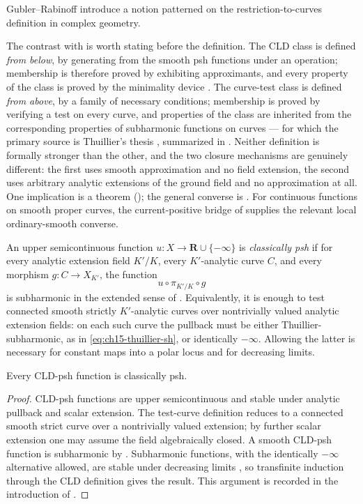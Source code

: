 Gubler--Rabinoff introduce a notion patterned on the restriction-to-curves
definition in complex geometry.

The contrast with  is worth stating before the definition.
The CLD class is defined \emph{from below}, by generating from the smooth
psh functions under an operation; membership is therefore proved by
exhibiting approximants, and every property of the class is proved by the
minimality device .  The curve-test class is
defined \emph{from above}, by a family of necessary conditions; membership is
proved by verifying a test on every curve, and properties of the class are
inherited from the corresponding properties of subharmonic functions on
curves --- for which the primary source is Thuillier's thesis \cite{Thu05},
summarized in .  Neither definition is
formally stronger than the other, and the two closure
mechanisms are genuinely different: the first uses smooth approximation and
no field extension, the second uses arbitrary analytic extensions of the
ground field and no approximation at all.  One implication is a theorem
(); the general converse is
.  For continuous functions on
smooth proper curves, the current-positive bridge of
 supplies the relevant
local ordinary-smooth converse.

\begin{definition}
\label{def:ch15-classical-psh}
An upper semicontinuous function
$u:X\to\mathbf R\cup\{-\infty\}$ is \emph{classically psh} if for every
analytic extension field $K'/K$, every $K'$-analytic curve $C$, and every
morphism $g:C\to X_{K'}$, the function
\[
                    u\circ\pi_{K'/K}\circ g
\]
is subharmonic in the extended sense of
\cite[Definition~3.4]{GR25Classical}.  Equivalently, it is enough to test
connected smooth strictly $K'$-analytic curves over nontrivially valued
analytic extension fields: on each such curve the pullback must be either
Thuillier-subharmonic, as in \eqref{eq:ch15-thuillier-sh}, or identically
$-\infty$.  Allowing the latter is necessary for constant maps into a
polar locus and for decreasing limits.
\end{definition}

\begin{theorem}\label{thm:cld-to-classical-psh}
Every CLD-psh function is classically psh.
\end{theorem}
\begin{proof}
CLD-psh functions are upper semicontinuous and stable under analytic pullback
and scalar extension.  The test-curve definition reduces to a connected
smooth strict curve over a nontrivially valued extension; by further scalar
extension one may assume the field algebraically closed.  A smooth
CLD-psh function is subharmonic by
\cite[Theorem~4.7]{Wanner19}.  Subharmonic functions, with the identically $-\infty$ alternative allowed,
are stable under decreasing limits \cite[Proposition~3.1.8]{Thu05}, so transfinite induction
through the CLD definition gives the result.  This argument is recorded in the introduction of
\cite{GR25Classical}.
\end{proof}

